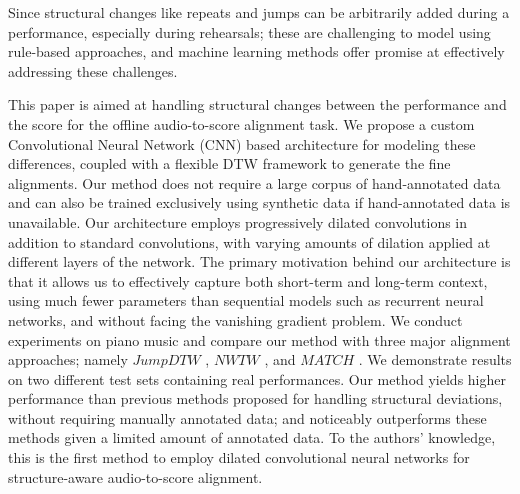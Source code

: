 \documentclass{article}
\begin{document}
 Since structural changes like repeats and jumps can be arbitrarily added during a performance, especially during rehearsals; these are challenging to model using rule-based approaches, and machine learning methods offer promise at effectively addressing these challenges. 
 \par This paper is aimed at handling structural changes between the performance and the score for the offline audio-to-score alignment task. We propose a custom Convolutional Neural Network (CNN) based architecture for modeling these differences, coupled with a flexible DTW framework to generate the fine alignments. 
 Our method does not require a large corpus of hand-annotated data and can also be trained exclusively using synthetic data if hand-annotated data is unavailable.
Our architecture employs progressively dilated convolutions in addition to standard convolutions, with varying amounts of dilation applied at different layers of the network. 
The primary motivation behind our architecture is that it allows us to effectively capture both short-term and long-term context, %
using much fewer parameters than sequential models such as recurrent neural networks, and without facing the vanishing gradient problem. We conduct experiments on piano music and compare our method with three major alignment approaches; namely \begin{math}\textit{JumpDTW}\end{math} \cite{Fremerey2010handling}, \begin{math}\textit{NWTW}\end{math} \cite{grachten2013automatic}, and \begin{math}\textit{MATCH}\end{math} \cite{dixon2005line}. 
We demonstrate results on two different test sets containing real performances. Our method yields higher performance than previous methods proposed for handling structural deviations, without requiring manually annotated data; and noticeably outperforms these methods given a limited amount of annotated data.  To the authors' knowledge, this is the first method to employ dilated convolutional neural networks for structure-aware audio-to-score alignment. 
\end{document}
